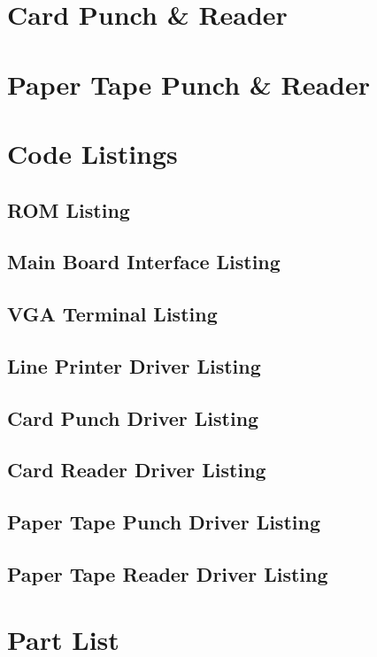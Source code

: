 \documentclass{book}
\begin{document}
\chapter{Card Punch \& Reader}
\chapter{Paper Tape Punch \& Reader}
\appendix
\chapter{Code Listings}
\lstset{numbers=left, numberstyle=\tiny, stepnumber=1, numbersep=5pt}
\section{ROM Listing}
\cleardoublepage
\section{Main Board Interface Listing}
\cleardoublepage
\section{VGA Terminal Listing}
\cleardoublepage
\section{Line Printer Driver Listing}

\cleardoublepage
\section{Card Punch Driver Listing}
\cleardoublepage
\section{Card Reader Driver Listing}
\cleardoublepage
\section{Paper Tape Punch Driver Listing}
\cleardoublepage
\section{Paper Tape Reader Driver Listing}

\chapter{Part List}
\end{document}

